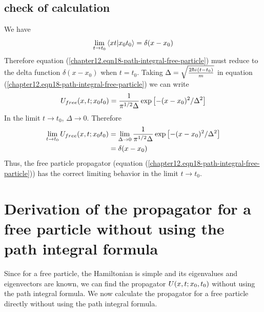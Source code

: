 	\subsection{check of calculation}
	We have
	\begin{equation}
		\lim\limits_{ t \rightarrow t_0} \braket{x t}{x_0 t_0} = \delta(x-x_0)
	\end{equation}
	Therefore equation (\ref{chapter12.eqn18-path-integral-free-particle}) must reduce to the delta function $\delta(x-x_0)$ when $t=t_0$. Taking $\Delta = \sqrt{\frac{2\hbar {i\mkern1mu} (t-t_0)}{m}}$ in equation (\ref{chapter12.eqn18-path-integral-free-particle}) we can write
	\begin{equation}
		U_{free}\qty(x, t; x_0 t_0) = \frac{1}{\pi^{1/2} \Delta} \exp\left[-(x-x_0)^2/\Delta^2\right]
	\end{equation}
	In the limit $t\rightarrow t_0$, $\Delta \rightarrow 0$. Therefore
	\begin{align}
		\lim\limits_{t\rightarrow t_0} U_{free}(x, t; x_0 t_0) &= \lim\limits_{\Delta \rightarrow 0} \frac{1}{\pi^{1/2} \Delta} \exp\left[-(x-x_0)^2 / \Delta^2\right] \\
		&= \delta\qty(x-x_0)
	\end{align}
	Thus, the free particle propagator (equation (\ref{chapter12.eqn18-path-integral-free-particle})) has the correct limiting behavior in the limit $t\rightarrow t_0$.
	
	\section{Derivation of the propagator for a free particle without using the path integral formula}
	Since for a free particle, the Hamiltonian is simple and its eigenvalues and eigenvectors are known, we can find the propagator $U\qty(x, t; x_0, t_0)$ without using the path integral formula. We now calculate the propagator for a free particle directly without using the path integral formula.
		
